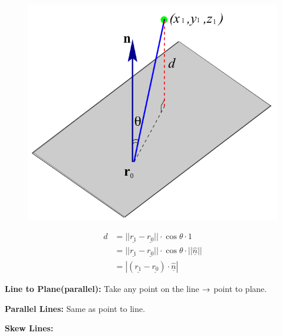 \documentclass[11pt, a4paper]{MATH2023}
\newcommand{\vct}{\underline}
\begin{document}
\begin{spacing}{1.3}
    \begin{figure}\centering
        \includegraphics[scale=0.3]{images/Ch10-dist-point-plane-2.jpeg}
    \end{figure}
    \begin{align*}
        d &= ||\vct{r_1}-\vct{r_0}||\cdot \cos\theta \cdot 1\\
         &= ||\vct{r_1}-\vct{r_0}||\cdot \cos\theta \cdot ||\hat{\vct{n}}||\\
         &= | (\vct{r_1}-\vct{r_0})\cdot \hat{\vct{n}} |
    \end{align*}

    \vspace{0.8in}

    {\bf Line to Plane(parallel): } Take any point on the line $\rightarrow$ point to plane.

    {\bf Parallel Lines: } Same as point to line.

    {\bf Skew Lines:} 


\end{spacing}
\end{document}

